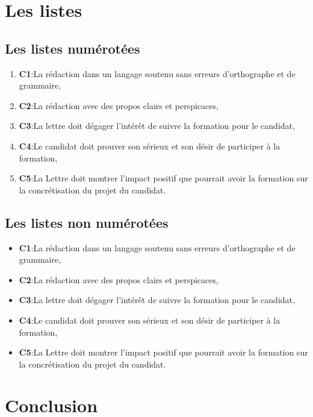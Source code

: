 \section{Les listes}
\subsection{Les listes numérotées}

\begin{enumerate}

\item \textbf{C1}:La rédaction dans un langage soutenu sans erreurs d'orthographe et de grammaire,
\item \textbf{C2}:La rédaction avec des propos clairs et perspicaces,
\item \textbf{C3}:La lettre doit dégager l'intérêt de suivre la formation pour le candidat,
\item \textbf{C4}:Le candidat doit prouver son sérieux et son désir de participer à la formation, 
\item \textbf{C5}:La Lettre doit montrer l'impact positif que pourrait avoir la formation sur la concrétisation du projet du candidat.
\end{enumerate}

\subsection{Les listes non numérotées}

\begin{itemize}

\item \textbf{C1}:La rédaction dans un langage soutenu sans erreurs d'orthographe et de grammaire,
\item \textbf{C2}:La rédaction avec des propos clairs et perspicaces,
\item \textbf{C3}:La lettre doit dégager l'intérêt de suivre la formation pour le candidat,
\item \textbf{C4}:Le candidat doit prouver son sérieux et son désir de participer à la formation, 
\item \textbf{C5}:La Lettre doit montrer l'impact positif que pourrait avoir la formation sur la concrétisation du projet du candidat.
\end{itemize}

\section{Conclusion}
